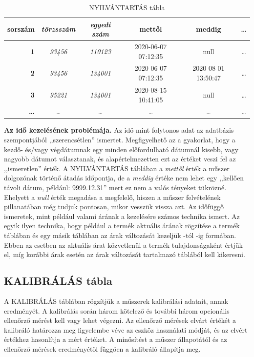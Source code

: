 \documentclass[a4paper,12pt]{report}
\newcommand{\tabla}[1]{\noindent\MakeUppercase{#1}} %
\begin{document}
\begin{table}[ht!]
	\centering
	\begin{footnotesize}
	\begin{tabular}[t]{|r|c|c|c|c|c|}
		\hline
		\textbf{sorszám}&\textit{törzsszám}&\textit{egyedi szám}&mettől&meddig&\dots \\ \hline
		\textbf{1}&\textit{93456}&\textit{110123}&2020-06-07 07:12:35&null&\dots\\
		\textbf{2}&\textit{93456}&\textit{134001}&2020-06-07 07:12:35&2020-08-01 13:50:47&\dots\\
		\textbf{3}&\textit{95221}&\textit{134001}&2020-08-15 10:41:05&null&\dots\\
		\textbf{\dots}&\textit{\dots}&\textit{\dots}&\dots&\dots&\dots\\
	\end{tabular}
\end{footnotesize}
	\caption{NYILVÁNTARTÁS tábla}\label{tabNYILVANTARTAS}
\end{table}


\begin{minipage}[t]{\linewidth}
\textsf{
		{\footnotesize \textbf{Az idő kezelésének problémája.}
	Az idő mint folytonos adat az adatbázis szempontjából ,,szerencsétlen'' ismertet. 
	Meg\-fi\-gyel\-he\-tő az a gyakorlat, hogy a kezdő- és/vagy végdátumnak egy minden előfordulható dátumnál kisebb, vagy nagyobb dátumot választanak, és alapértelmezetten ezt az értéket veszi fel az ,,ismeretlen'' érték.
	A \tabla{nyilvántartás} táblában a \textit{mettől} érték a műszer dolgozónak történő átadás időpontja, de a \textit{meddig} értéke nem lehet egy ,,kellően távoli dátum, például: 9999.12.31'' mert ez nem a valós tényeket tükrözné. Ehelyett a \textit{null} érték megadása a megfelelő, hiszen a műszer felvételének pillanatában még tudjuk pontosan, mikor vesszük vissza azt.
	Az időfüggő ismeretek, mint például valami árának a kezelésére számos technika ismert. Az egyik ilyen technika, hogy például a termék aktuális árának rögzítése a termék táblában és egy másik táblában az árak változását kezeljük -tól -ig formában. Ebben az esetben az aktuális árat közvetlenül a termék tulajdonságaként értjük el, míg korábbi árak esetén az árak változását tartalmazó táblából kell kikeresni.
	}
}
\end{minipage}

\subsection{KALIBRÁLÁS tábla}
A \tabla{kalibrálás} táblában rögzítjük a műszerek kalibrálási adatait, annak eredményét. A kalibrálás során három kötelező és további három opcionális ellenőrző mérést kell vagy lehet végezni. Az ellenőrző mérések elvárt értékét a kalibráló határozza meg figyelembe véve az eszköz használati módját, és az elvért értékhez hasonlítja a mért értéket. A minősítést a műszer állapotától és az ellenőrző mérések eredményétől függően a kalibráló állapítja meg.
\\
\end{document}
